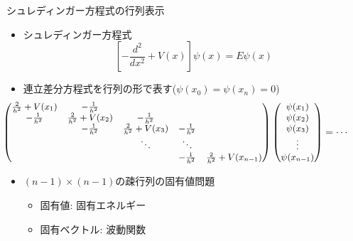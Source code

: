 \begin{frame}[t,fragile]{シュレディンガー方程式の行列表示}
  \begin{itemize}
  \item シュレディンガー方程式
    \[
    [-\frac{d^2}{dx^2}+V(x)]\psi(x) = E \psi(x)
    \]
  \item 連立差分方程式を行列の形で表す($\psi(x_0)=\psi(x_n)=0$)
    \[\begin{small}\hspace*{-4em}
    \begin{pmatrix}
      \frac{2}{h^2}+V(x_1) & -\frac{1}{h^2} \\
      -\frac{1}{h^2} & \frac{2}{h^2}+V(x_2) & -\frac{1}{h^2} \\
      & -\frac{1}{h^2} & \frac{2}{h^2}+V(x_3) & -\frac{1}{h^2} \\
      & & \ddots & \ddots \\
      & & & -\frac{1}{h^2} & \frac{2}{h^2}+V(x_{n-1}) \\
    \end{pmatrix}
    \begin{pmatrix}
      \psi(x_1) \\
      \psi(x_2) \\
      \psi(x_3) \\
      \vdots \\
      \psi(x_{n-1}) \\
    \end{pmatrix}
    = \cdots %
    \end{small}
    \]
  \item $(n-1) \times (n-1)$の疎行列の固有値問題
    \begin{itemize}
    \item 固有値: 固有エネルギー
    \item 固有ベクトル: 波動関数
    \end{itemize}
  \end{itemize}
\end{frame}
